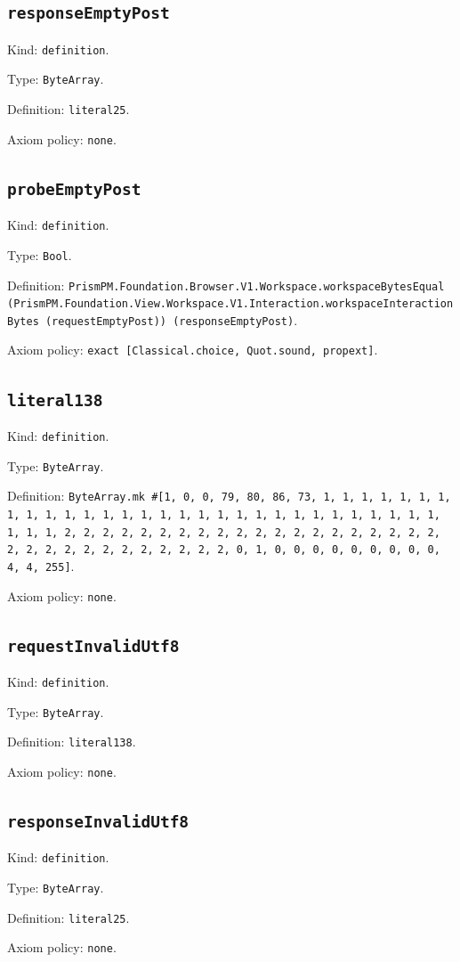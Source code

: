 \documentclass[11pt]{article}
\begin{document}
\subsection*{\texttt{responseEmptyPost}}
\noindent Kind: \texttt{definition}.\par
\noindent Type: \texttt{ByteArray}.\par
\noindent Definition: \texttt{literal25}.\par
\noindent Axiom policy: \texttt{none}.\par
\subsection*{\texttt{probeEmptyPost}}
\noindent Kind: \texttt{definition}.\par
\noindent Type: \texttt{Bool}.\par
\noindent Definition: \texttt{PrismPM.Foundation.Browser.V1.Workspace.workspaceBytesEqual (PrismPM.Foundation.View.Workspace.V1.Interaction.workspaceInteractionBytes (requestEmptyPost)) (responseEmptyPost)}.\par
\noindent Axiom policy: \texttt{exact [Classical.choice, Quot.sound, propext]}.\par
\subsection*{\texttt{literal138}}
\noindent Kind: \texttt{definition}.\par
\noindent Type: \texttt{ByteArray}.\par
\noindent Definition: \texttt{ByteArray.mk \#[1, 0, 0, 79, 80, 86, 73, 1, 1, 1, 1, 1, 1, 1, 1, 1, 1, 1, 1, 1, 1, 1, 1, 1, 1, 1, 1, 1, 1, 1, 1, 1, 1, 1, 1, 1, 1, 1, 1, 1, 2, 2, 2, 2, 2, 2, 2, 2, 2, 2, 2, 2, 2, 2, 2, 2, 2, 2, 2, 2, 2, 2, 2, 2, 2, 2, 2, 2, 2, 2, 2, 2, 0, 1, 0, 0, 0, 0, 0, 0, 0, 0, 0, 4, 4, 255]}.\par
\noindent Axiom policy: \texttt{none}.\par
\subsection*{\texttt{requestInvalidUtf8}}
\noindent Kind: \texttt{definition}.\par
\noindent Type: \texttt{ByteArray}.\par
\noindent Definition: \texttt{literal138}.\par
\noindent Axiom policy: \texttt{none}.\par
\subsection*{\texttt{responseInvalidUtf8}}
\noindent Kind: \texttt{definition}.\par
\noindent Type: \texttt{ByteArray}.\par
\noindent Definition: \texttt{literal25}.\par
\noindent Axiom policy: \texttt{none}.\par
\end{document}
